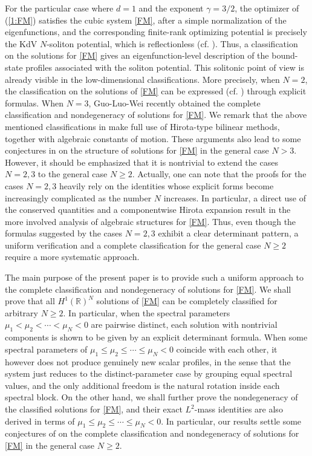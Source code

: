 \documentclass[11pt]{article}
\numberwithin{equation}{section}
\theoremstyle{definition}
\begin{document}
For the particular case where \(d=1\) and  the
exponent \(\gamma=3/2\), the optimizer of (\ref{1:FM}) satisfies  the cubic system \eqref{FM}, after a simple normalization
of the eigenfunctions, and the corresponding finite-rank optimizing potential is precisely the
KdV \(N\)-soliton potential, which is reflectionless (cf. \cite{Lewin3}).
Thus, a classification on the solutions for \eqref{FM} gives an
eigenfunction-level description of the bound-state profiles associated with
the soliton potential. This solitonic point of view is already visible in the low-dimensional
classifications. More precisely, when \(N=2\), the classification  on the solutions of \eqref{FM} can be
expressed (cf. \cite{Lewin}) through explicit formulas. When \(N=3\), Guo-Luo-Wei
\cite{GLW2026} recently obtained the complete classification and nondegeneracy of solutions for \eqref{FM}.
We remark that the above mentioned classifications in \cite{Lewin,GLW2026} make full use of  Hirota-type bilinear
methods, together with algebraic  constants of
motion.  These arguments also lead to some conjectures in \cite{GLW2026} on the structure of
solutions for \eqref{FM} in the general case \(N>3\).
However, it should be emphasized that it is nontrivial to extend the cases  \(N=2,3\) to the  general case \(N\ge 2\). Actually, one can note that the proofs for the cases \(N=2,3\) heavily rely on the identities whose explicit
forms become  increasingly complicated as the number $N$ increases.
In particular, a direct use of the conserved quantities and a componentwise
Hirota expansion result in the more involved analysis of algebraic structures for \eqref{FM}.
Thus, even though the formulas suggested by the cases \(N=2,3\) exhibit a clear determinant pattern, a uniform verification and a complete classification for the general case \(N\geq 2\) require a more systematic approach.




The main purpose of the present paper is to provide such a uniform approach to the complete classification and nondegeneracy of solutions for \eqref{FM}.  We shall prove that
all \(H^1(\mathbb R)^N\) solutions of \eqref{FM} can be completely
classified for arbitrary \(N\ge2\).  In particular, when the spectral parameters  $\mu_1<\mu_2<\cdots<\mu_N<0$ are
pairwise distinct, each solution with nontrivial components is shown to be
given by an explicit determinant formula.  When some spectral parameters of $\mu_1\le \mu_2\le \cdots\le\mu_N<0$
coincide with each other, it however does not produce genuinely new scalar profiles, in the sense that the system just reduces to the distinct-parameter case by grouping equal spectral values, and the
only additional freedom is the natural rotation inside each spectral block.
On the other hand, we shall further prove the nondegeneracy of the classified solutions for \eqref{FM}, and their exact
\(L^2\)-mass identities are also derived in terms of $\mu_1\le \mu_2\le \cdots\le\mu_N<0$.  In particular, our results settle some conjectures of \cite{Lewin,GLW2026} on the complete classification and nondegeneracy  of solutions for \eqref{FM} in the general case \(N\ge 2\).
\end{document}
